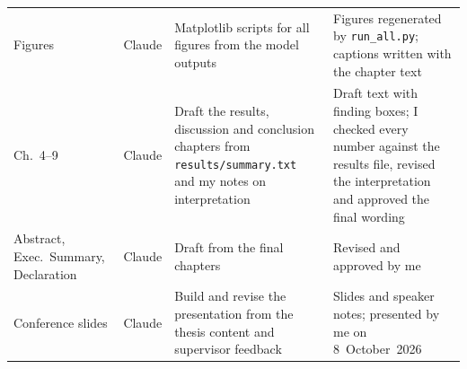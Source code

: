 \begin{longtable}{>{\raggedright\arraybackslash}p{2.2cm}
  >{\raggedright\arraybackslash}p{1.6cm}
  >{\raggedright\arraybackslash}p{4.3cm}
  >{\raggedright\arraybackslash}p{6.0cm}}
Figures & Claude & Matplotlib scripts for all figures from the model outputs & Figures regenerated by \texttt{run\_all.py}; captions written with the chapter text \\
Ch.~4--9 & Claude & Draft the results, discussion and conclusion chapters from \texttt{results/summary.txt} and my notes on interpretation & Draft text with finding boxes; I checked every number against the results file, revised the interpretation and approved the final wording \\
Abstract, Exec.\ Summary, Declaration & Claude & Draft from the final chapters & Revised and approved by me \\
Conference slides & Claude & Build and revise the presentation from the thesis content and supervisor feedback & Slides and speaker notes; presented by me on 8~October~2026 \\
\end{longtable}
